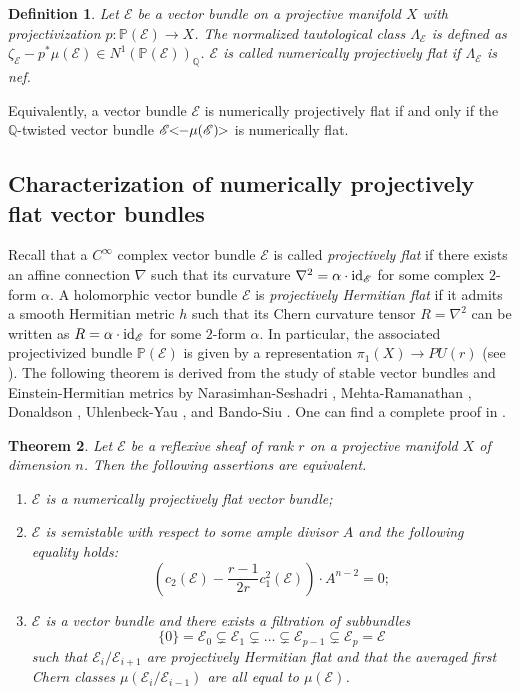 \documentclass[english,reqno]{amsart}
\newcommand\bbP{{\mathbb P}}
\newcommand\bbQ{{\mathbb Q}}
\newcommand\sE{{\mathscr E}}
\newcommand{\id}{{\rm id}}
\theoremstyle{plain}
\newtheorem{thm}{Theorem}[section]
\newtheorem{defn}[thm]{Definition}
\theoremstyle{definition}
\numberwithin{equation}{section} %
\begin{document}
\begin{defn}
    Let $\sE$ be a vector bundle on a projective manifold $X$ with projectivization $p\colon \bbP(\sE)\rightarrow X$. The normalized tautological class $\Lambda_{\sE}$ is defined as $\zeta_{\sE}-p^*\mu(\sE)\in N^1(\bbP(\sE))_{\bbQ}$.  $\sE$ is called \emph{numerically projectively flat} if $\Lambda_{\sE}$ is nef.
\end{defn}

\noindent Equivalently, a vector bundle $\sE$ is numerically projectively flat if and only if the $\mathbb{Q}$-twisted vector bundle  $\sE\hspace{-0.8ex}<\hspace{-0.8ex}-\mu(\sE)\hspace{-0.8ex}>$ is numerically flat.

\subsection{Characterization of numerically projectively flat vector bundles}

Recall that a $C^\infty$ complex vector bundle $\sE$ is called \emph{projectively flat} if there exists an affine connection $\nabla$ such that its curvature $\nabla^2=\alpha\cdot \id_{\sE}$ for some complex  $2$-form $\alpha$. A holomorphic vector bundle $\sE$ is \emph{projectively Hermitian flat} if it admits a smooth Hermitian metric $h$ such that its Chern  curvature tensor $R=\nabla^2$ can be written as  $R=\alpha \cdot\id_{\sE}$ for some $2$-form $\alpha$.  In particular, the associated projectivized bundle $\bbP(\sE)$ is given by a representation $\pi_1(X)\rightarrow PU(r)$ (see \cite[Corollary 4.3]{Nakayama2004}). The following theorem is derived from the study of stable vector bundles and Einstein-Hermitian metrics by Narasimhan-Seshadri \cite{NarasimhanSeshadri1965}, Mehta-Ramanathan \cite{MehtaRamanathan1981/82,MehtaRamanathan1984}, Donaldson \cite{Donaldson1985}, Uhlenbeck-Yau \cite{UhlenbeckYau1986}, and Bando-Siu \cite{BandoSiu1994}. One can find a complete proof in \cite[IV, Theorem 4.1]{Nakayama2004}.

\begin{thm}
\label{thm:num-proj-flat-criterion-Nakayama}
Let $\sE$ be a reflexive sheaf of rank $r$ on a projective manifold $X$ of dimension $n$. Then the following assertions are equivalent.
\begin{enumerate}
\item $\sE$ is a numerically projectively flat vector bundle;
\item $\sE$ is semistable with respect to some ample divisor $A$ and the following equality holds: \[\left(c_2(\sE)-\frac{r-1}{2r}c_1^2(\sE)\right)\cdot A^{n-2}=0;\]
\item $\sE$ is a vector bundle and there exists a filtration of  subbundles
\[\{0\}=\sE_0\subsetneq \sE_1\subsetneq \dots\subsetneq \sE_{p-1}\subsetneq \sE_p=\sE\]
such that $\sE_i/\sE_{i+1}$ are  projectively Hermitian  flat and that the averaged first Chern classes $\mu(\sE_i/\sE_{i-1})$ are all equal to $\mu(\sE)$.
\end{enumerate}
\end{thm}
\end{document}
